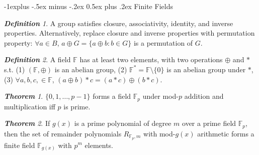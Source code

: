 \documentclass[frenchspacing,9pt,landscape,a4paper]{article}
\makeatletter
\renewcommand{\subsection}{\@startsection{subsection}{2}{0mm}%
                                {-1explus -.5ex minus -.2ex}%
                                {0.5ex plus .2ex}%
                                {\normalfont\normalsize\bfseries}}
\newcommand{\BF}{\mathbb F}
\theoremstyle{remark}
\newtheorem*{thm}{\textbf{Theorem}}
\newtheorem*{defn}{\textbf{Definition}}
\makeatother
\begin{document}
\begin{multicols}{4}
\subsection{Finite Fields}
\begin{defn}
    A group satisfies closure, associativity, identity, and inverse properties. Alternatively, replace
    closure and inverse properties with permutation property: $\forall a\in B$,  $a\oplus G=\{a\oplus
    b:b\in G\}$ is a permutation of  $G$.
\end{defn}
\begin{defn}
    A field $\mathbb{F}$ has at least two elements, with two operations  $\oplus$ and  $*$ s.t. (1)
    $(\BF,\oplus)$ is an abelian group, (2)  $\BF^*=\BF\setminus\{0\}$ is an abelian group under  $*$, (3)
     $\forall a,b,c,\in\BF$,  $(a\oplus b)*c=(a*c)\oplus(b*c)$.
\end{defn}
\begin{thm}
    $\{0,1,\dots,p-1\}$ forms a field  $\BF_p$ under mod-$p$ addition and multiplication iff  $p$ is prime.
\end{thm}
\begin{thm}
    If $g(x)$ is a prime polynomial of degree  $m$ over a prime field  $\BF_p$, then the set of remainder
    polynomials  $R_{\BF_p,m}$ with mod-$g(x)$ arithmetic forms a finite field $\BF_{g(x)}$ with  $p^m$
    elements.
\end{thm}

\end{multicols}
\end{document}
